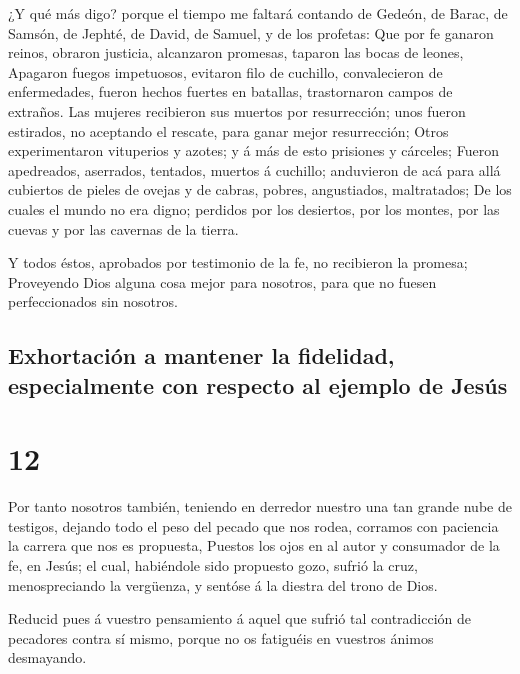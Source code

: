  ¿Y qué más digo? porque el tiempo me faltará contando de
Gedeón, de Barac, de Samsón, de Jephté, de David, de Samuel, y de los
profetas:  Que por fe ganaron reinos, obraron justicia,
alcanzaron promesas, taparon las bocas de leones, 
Apagaron fuegos impetuosos, evitaron filo de cuchillo, convalecieron de
enfermedades, fueron hechos fuertes en batallas, trastornaron campos de
extraños.  Las mujeres recibieron sus muertos por
resurrección; unos fueron estirados, no aceptando el rescate, para ganar
mejor resurrección;  Otros experimentaron vituperios y
azotes; y á más de esto prisiones y cárceles;  Fueron
apedreados, aserrados, tentados, muertos á cuchillo; anduvieron de acá
para allá cubiertos de pieles de ovejas y de cabras, pobres,
angustiados, maltratados;  De los cuales el mundo no era
digno; perdidos por los desiertos, por los montes, por las cuevas y por
las cavernas de la tierra.

 Y todos éstos, aprobados por testimonio de la fe, no
recibieron la promesa;  Proveyendo Dios alguna cosa mejor
para nosotros, para que no fuesen perfeccionados sin nosotros.

\hypertarget{exhortaciuxf3n-a-mantener-la-fidelidad-especialmente-con-respecto-al-ejemplo-de-jesuxfas}{%
\subsection{Exhortación a mantener la fidelidad, especialmente con
respecto al ejemplo de
Jesús}\label{exhortaciuxf3n-a-mantener-la-fidelidad-especialmente-con-respecto-al-ejemplo-de-jesuxfas}}

\hypertarget{section-58-12}{%
\section{12}\label{section-58-12}}

 Por tanto nosotros también, teniendo en derredor nuestro
una tan grande nube de testigos, dejando todo el peso del pecado que nos
rodea, corramos con paciencia la carrera que nos es propuesta,
 Puestos los ojos en al autor y consumador de la fe, en
Jesús; el cual, habiéndole sido propuesto gozo, sufrió la cruz,
menospreciando la vergüenza, y sentóse á la diestra del trono de Dios.

 Reducid pues á vuestro pensamiento á aquel que sufrió tal
contradicción de pecadores contra sí mismo, porque no os fatiguéis en
vuestros ánimos desmayando.

